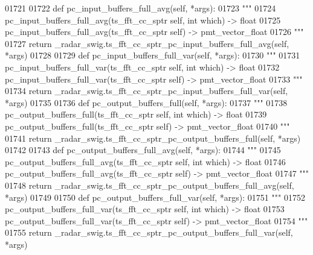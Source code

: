 \begin{DoxyCode}
{{{{{{{01721 
01722     \textcolor{keyword}{def }pc_input_buffers_full_avg(self, *args):
01723         \textcolor{stringliteral}{"""}
01724 \textcolor{stringliteral}{        pc\_input\_buffers\_full\_avg(ts\_fft\_cc\_sptr self, int which) -> float}
01725 \textcolor{stringliteral}{        pc\_input\_buffers\_full\_avg(ts\_fft\_cc\_sptr self) -> pmt\_vector\_float}
01726 \textcolor{stringliteral}{        """}
01727         \textcolor{keywordflow}{return} \_radar\_swig.ts\_fft\_cc\_sptr\_pc\_input\_buffers\_full\_avg(self, *args)
01728 
01729     \textcolor{keyword}{def }pc_input_buffers_full_var(self, *args):
01730         \textcolor{stringliteral}{"""}
01731 \textcolor{stringliteral}{        pc\_input\_buffers\_full\_var(ts\_fft\_cc\_sptr self, int which) -> float}
01732 \textcolor{stringliteral}{        pc\_input\_buffers\_full\_var(ts\_fft\_cc\_sptr self) -> pmt\_vector\_float}
01733 \textcolor{stringliteral}{        """}
01734         \textcolor{keywordflow}{return} \_radar\_swig.ts\_fft\_cc\_sptr\_pc\_input\_buffers\_full\_var(self, *args)
01735 
01736     \textcolor{keyword}{def }pc_output_buffers_full(self, *args):
01737         \textcolor{stringliteral}{"""}
01738 \textcolor{stringliteral}{        pc\_output\_buffers\_full(ts\_fft\_cc\_sptr self, int which) -> float}
01739 \textcolor{stringliteral}{        pc\_output\_buffers\_full(ts\_fft\_cc\_sptr self) -> pmt\_vector\_float}
01740 \textcolor{stringliteral}{        """}
01741         \textcolor{keywordflow}{return} \_radar\_swig.ts\_fft\_cc\_sptr\_pc\_output\_buffers\_full(self, *args)
01742 
01743     \textcolor{keyword}{def }pc_output_buffers_full_avg(self, *args):
01744         \textcolor{stringliteral}{"""}
01745 \textcolor{stringliteral}{        pc\_output\_buffers\_full\_avg(ts\_fft\_cc\_sptr self, int which) -> float}
01746 \textcolor{stringliteral}{        pc\_output\_buffers\_full\_avg(ts\_fft\_cc\_sptr self) -> pmt\_vector\_float}
01747 \textcolor{stringliteral}{        """}
01748         \textcolor{keywordflow}{return} \_radar\_swig.ts\_fft\_cc\_sptr\_pc\_output\_buffers\_full\_avg(self, *args)
01749 
01750     \textcolor{keyword}{def }pc_output_buffers_full_var(self, *args):
01751         \textcolor{stringliteral}{"""}
01752 \textcolor{stringliteral}{        pc\_output\_buffers\_full\_var(ts\_fft\_cc\_sptr self, int which) -> float}
01753 \textcolor{stringliteral}{        pc\_output\_buffers\_full\_var(ts\_fft\_cc\_sptr self) -> pmt\_vector\_float}
01754 \textcolor{stringliteral}{        """}
01755         \textcolor{keywordflow}{return} \_radar\_swig.ts\_fft\_cc\_sptr\_pc\_output\_buffers\_full\_var(self, *args)
}}}}}}}
\end{DoxyCode}
